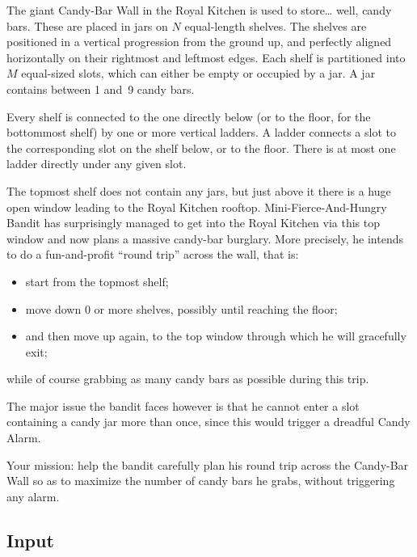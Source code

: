 
\noindent
The giant Candy-Bar Wall in the Royal Kitchen is used to store\dots{}
well, candy bars.
These are placed in jars on $N$ equal-length shelves.
The shelves are positioned in a vertical progression from the ground up, and perfectly
aligned horizontally on their rightmost and leftmost edges.
Each shelf is partitioned into $M$ 
 equal-sized slots, which can either be empty or occupied by a jar.
A jar contains between 1 and~9 candy bars.

Every shelf is connected to the one directly below (or to
the floor, for the bottommost shelf) by one or more
vertical ladders. A ladder connects a slot to the corresponding slot on
the shelf below, or to the floor.
There is at most one ladder directly under any given slot. 

The topmost shelf does not contain any jars,
but just above it there is a huge open window leading to the Royal
Kitchen rooftop. Mini-Fierce-And-Hungry Bandit has surprisingly managed to get into the Royal Kitchen via this top window and now plans a massive candy-bar burglary. More precisely, he intends to do a fun-and-profit ``round trip'' across the wall, that
is:

\begin{itemize}
  \item  start from the topmost shelf;

\item move down 0 or more shelves, possibly until reaching the floor;

\item and then move up again, to the top window through which he will
gracefully exit;
\end{itemize}

\noindent while of course grabbing as many candy bars as possible during this trip.

The major issue the bandit faces however is that he cannot enter a slot
containing a candy jar more than once, since this would trigger a dreadful
Candy Alarm. 

Your mission: help the bandit carefully plan his round trip across
the Candy-Bar Wall so as to maximize the number of candy bars he grabs,
without triggering any alarm.

\subsection*{Input}

